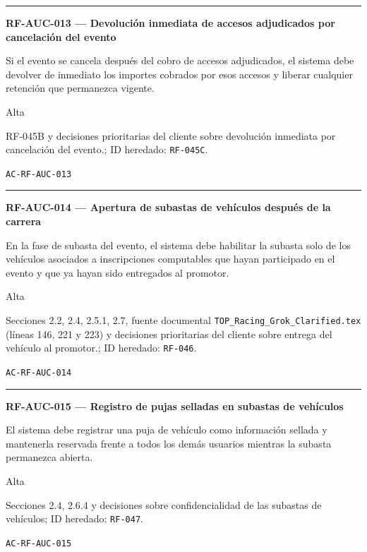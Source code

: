\documentclass[10pt,letterpaper]{article}
\begin{document}
\vspace{0.25em}\hrule\vspace{0.65em}
\noindent\textbf{RF-AUC-013 --- Devolución inmediata de accesos adjudicados por cancelación del evento}\par
\begin{description}[style=nextline,leftmargin=3.15cm,labelwidth=2.8cm,font=\normalfont\bfseries]
\item[Obligación] Si el evento se cancela después del cobro de accesos adjudicados, el sistema debe devolver de inmediato los importes cobrados por esos accesos y liberar cualquier retención que permanezca vigente.
\item[Prioridad] Alta
\item[Procedencia] RF-045B y decisiones prioritarias del cliente sobre devolución inmediata por cancelación del evento.; ID heredado: \texttt{RF-045C}.
\item[Verificación] \texttt{AC-RF-AUC-013}
\end{description}
\vspace{0.25em}\hrule\vspace{0.65em}
\noindent\textbf{RF-AUC-014 --- Apertura de subastas de vehículos después de la carrera}\par
\begin{description}[style=nextline,leftmargin=3.15cm,labelwidth=2.8cm,font=\normalfont\bfseries]
\item[Obligación] En la fase de subasta del evento, el sistema debe habilitar la subasta solo de los vehículos asociados a inscripciones computables que hayan participado en el evento y que ya hayan sido entregados al promotor.
\item[Prioridad] Alta
\item[Procedencia] Secciones 2.2, 2.4, 2.5.1, 2.7, fuente documental \texttt{TOP\_Racing\_Grok\_Clarified.tex} (líneas 146, 221 y 223) y decisiones prioritarias del cliente sobre entrega del vehículo al promotor.; ID heredado: \texttt{RF-046}.
\item[Verificación] \texttt{AC-RF-AUC-014}
\end{description}
\vspace{0.25em}\hrule\vspace{0.65em}
\noindent\textbf{RF-AUC-015 --- Registro de pujas selladas en subastas de vehículos}\par
\begin{description}[style=nextline,leftmargin=3.15cm,labelwidth=2.8cm,font=\normalfont\bfseries]
\item[Obligación] El sistema debe registrar una puja de vehículo como información sellada y mantenerla reservada frente a todos los demás usuarios mientras la subasta permanezca abierta.
\item[Prioridad] Alta
\item[Procedencia] Secciones 2.4, 2.6.4 y decisiones sobre confidencialidad de las subastas de vehículos; ID heredado: \texttt{RF-047}.
\item[Verificación] \texttt{AC-RF-AUC-015}
\end{description}
\end{document}
